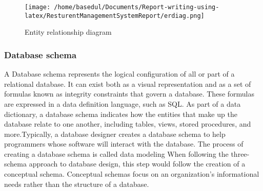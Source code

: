 \documentclass[12pt,a4paper]{article}
\newcommand\tab[1][.7cm]{\hspace*{#1}}
\begin{document}
		\begin{figure}[H]
		\centering
		\texttt{[image: /home/basedul/Documents/Report-writing-using-latex/ResturentManagementSystemReport/erdiag.png]}
		\caption{\hspace{0.35em}Entity relationship diagram}
		\label{fig:erdig} 
	\end{figure}
	\subsubsection{Database schema}

		\tab A Database schema \cite{Ref:16} represents the logical configuration of all or part of a relational database. It can exist both as a visual representation and as a set of formulas known as integrity constraints that govern a database. These formulas are expressed in a data definition language, such as SQL. As part of a data dictionary, a database schema indicates how the entities that make up the database relate to one another, including tables, views, stored procedures, and more.Typically, a database designer creates a database schema to help programmers whose software will interact with the database. The process of creating a database schema is called data modeling When following the three-schema approach to database design, this step would follow the creation of a conceptual schema. Conceptual schemas focus on an organization’s informational needs rather than the structure of a database.
\end{document}

